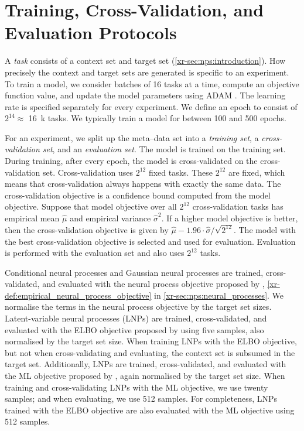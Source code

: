 \documentclass[12pt]{report}
\newcommand{\xrprefix}[1]{xr-#1}
\begin{document}
\section{Training, Cross-Validation, and Evaluation Protocols}
\label{sec:experimental_details:protocols}

A \emph{task} consists of a context set and target set (\cref{\xrprefix{sec:nps:introduction}}).
How precisely the context and target sets are generated is specific to an experiment.
To train a model, we consider batches of 16 tasks at a time, compute an objective function value, and update the model parameters using ADAM \parencite{Kingma:2014:Adam_A_Method_for_Stochastic}.
The learning rate is specified separately for every experiment.
We define an epoch to consist of $2^{14} \approx$ \SI{16}{k} tasks.
We typically train a model for between 100 and 500 epochs.

For an experiment, we split up the meta--data set into a \emph{training set}, a \emph{cross-validation set}, and an \emph{evaluation set}.
The model is trained on the training set.
During training, after every epoch, the model is cross-validated on the cross-validation set.
Cross-validation uses $2^{12}$ fixed tasks.
These $2^{12}$ are fixed, which means that cross-validation always happens with exactly the same data.
The cross-validation objective is a confidence bound computed from the model objective.
Suppose that model objective over all $2^{12}$ cross-validation tasks has empirical mean $\hat\mu$ and empirical variance $\hat\sigma^2$.
If a higher model objective is better, then the cross-validation objective is given by $\hat\mu - 1.96 \cdot \hat\sigma / \sqrt{2^{12}}$.
The model with the best cross-validation objective is selected and used for evaluation.
Evaluation is performed with the evaluation set and also uses $2^{12}$ tasks.

Conditional neural processes and Gaussian neural processes are trained, cross-validated, and evaluated with the neural process objective proposed by \textcite{Garnelo:2018:Conditional_Neural_Processes}, \eqref{\xrprefix{def:empirical_neural_process_objective}} in \cref{\xrprefix{sec:nps:neural_processes}}.
We normalise the terms in the neural process objective by the target set sizes.
Latent-variable neural processes (LNPs) are trained, cross-validated, and evaluated with the ELBO objective proposed by \textcite{Garnelo:2018:Neural_Processes} using five samples, also normalised by the target set size.
When training LNPs with the ELBO objective, but not when cross-validating and evaluating, the context set is subsumed in the target set.
Additionally, LNPs are trained, cross-validated, and evaluated with the ML objective proposed by \textcite{Foong:2020:Meta-Learning_Stationary_Stochastic_Process_Prediction}, again normalised by the target set size.
When training and cross-validating LNPs with the ML objective, we use twenty samples;
and when evaluating, we use 512 samples.
For completeness, LNPs trained with the ELBO objective are also evaluated with the ML objective using 512 samples.
\end{document}
